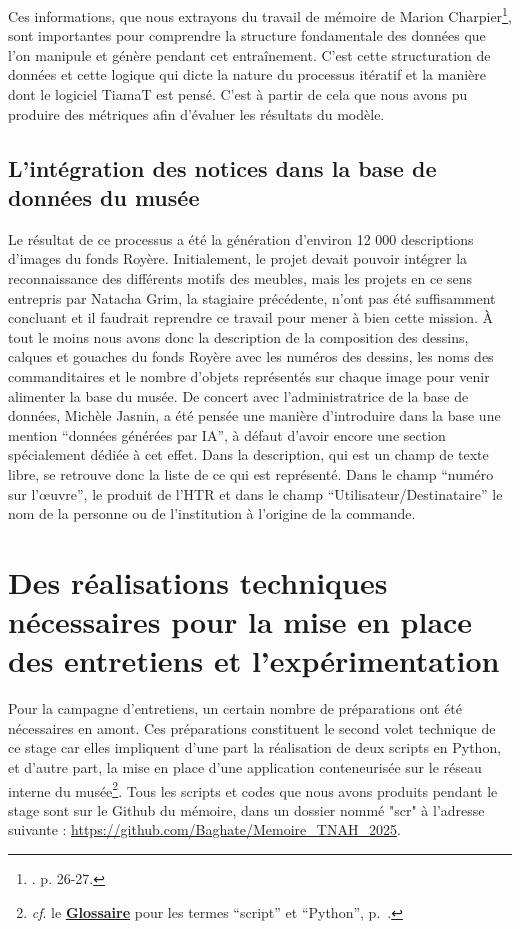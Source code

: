 Ces informations, que nous extrayons du travail de mémoire de Marion Charpier\footnote{\cite{charpier_computer_2023}. p. 26-27.}, sont importantes pour comprendre la structure fondamentale des données que l'on manipule et génère pendant cet entraînement. C'est cette structuration de données et cette logique qui dicte la nature du processus itératif et la manière dont le logiciel TiamaT est pensé. C'est à partir de cela que nous avons pu produire des métriques afin d'évaluer les résultats du modèle. \\[1cm]

\subsection{L'intégration des notices dans la base de données du musée}

Le résultat de ce processus a été la génération d'environ 12 000 descriptions d'images du fonds Royère. Initialement, le projet devait pouvoir intégrer la reconnaissance des différents motifs des meubles, mais les projets en ce sens entrepris par Natacha Grim, la stagiaire précédente, n'ont pas été suffisamment concluant et il faudrait reprendre ce travail pour mener à bien cette mission. À tout le moins nous avons donc la description de la composition des dessins, calques et gouaches du fonds Royère avec les numéros des dessins, les noms des commanditaires et le nombre d'objets représentés sur chaque image pour venir alimenter la base du musée. De concert avec l'administratrice de la base de données, Michèle Jasnin, a été pensée une manière d'introduire dans la base une mention \enquote{données générées par IA}, à défaut d'avoir encore une section spécialement dédiée à cet effet. Dans la description, qui est un champ de texte libre, se retrouve donc la liste de ce qui est représenté. Dans le champ \enquote{numéro sur l’œuvre}, le produit de l'HTR et dans le champ \enquote{Utilisateur/Destinataire} le nom de la personne ou de l'institution à l'origine de la commande.

\section{Des réalisations techniques nécessaires pour la mise en place des entretiens et l'expérimentation}

Pour la campagne d'entretiens, un certain nombre de préparations ont été nécessaires en amont. Ces préparations constituent le second volet technique de ce stage car elles impliquent d'une part la réalisation de deux scripts en Python, et d'autre part, la mise en place d'une application conteneurisée sur le réseau interne du musée\footnote{\textit{cf}. le \textbf{\hyperref[sec:Glossaire]{Glossaire}} pour les termes \enquote{script} et \enquote{Python}, p.~\pageref{sec:Glossaire}.}. Tous les scripts et codes que nous avons produits pendant le stage sont sur le Github du mémoire, dans un dossier nommé "scr" à l'adresse suivante : \url{https://github.com/Baghate/Memoire_TNAH_2025}.

